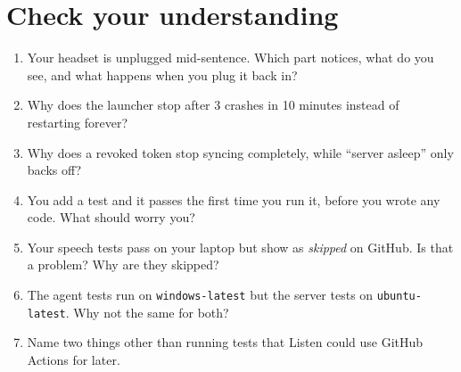 \documentclass[11pt,a4paper]{article}
\begin{document}
\section{Check your understanding}
\begin{exercise}
\begin{enumerate}
  \item Your headset is unplugged mid-sentence. Which part notices, what do you see, and what
        happens when you plug it back in?
  \item Why does the launcher stop after 3 crashes in 10 minutes instead of restarting forever?
  \item Why does a revoked token stop syncing completely, while ``server asleep'' only backs off?
  \item You add a test and it passes the first time you run it, before you wrote any code. What
        should worry you?
  \item Your speech tests pass on your laptop but show as \emph{skipped} on GitHub. Is that a
        problem? Why are they skipped?
  \item The agent tests run on \texttt{windows-latest} but the server tests on
        \texttt{ubuntu-latest}. Why not the same for both?
  \item Name two things other than running tests that Listen could use GitHub Actions for later.
\end{enumerate}
\end{exercise}
\end{document}
